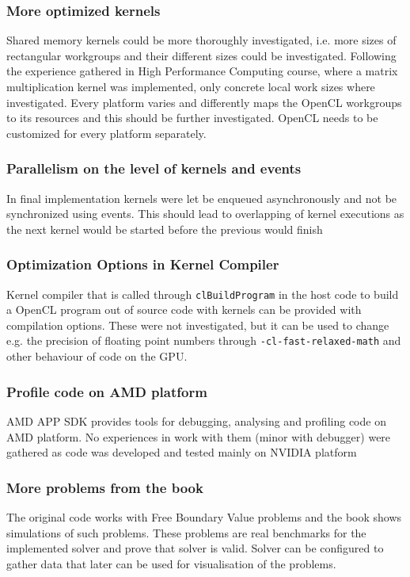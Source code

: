\subsubsection{More optimized kernels}
Shared memory kernels could be more thoroughly investigated, i.e. more sizes of rectangular workgroups and their different sizes could be investigated. Following the experience gathered in High Performance Computing course, where a matrix multiplication kernel was implemented, only concrete local work sizes where investigated. Every platform varies and differently maps the OpenCL workgroups to its resources and this should be further investigated. OpenCL needs to be customized for every platform separately. 

\subsubsection{Parallelism on the level of kernels and events}
In final implementation kernels were let be enqueued asynchronously and not be synchronized using events. This should lead to overlapping of kernel executions as the next kernel would be started before the previous would finish

\subsubsection{Optimization Options in Kernel Compiler}
Kernel compiler that is called through \texttt{clBuildProgram} in the host code to build a OpenCL program out of source code with kernels can be provided with compilation options. These were not investigated, but it can be used to change e.g. the precision of floating point numbers through \texttt{-cl-fast-relaxed-math} and other behaviour of code on the GPU.

\subsubsection{Profile code on AMD platform}
AMD APP SDK provides tools for debugging, analysing and profiling code on AMD platform. No  experiences in work with them (minor with debugger) were gathered as code was developed and tested mainly on NVIDIA platform 

\subsubsection{More problems from the book}
The original code works with Free Boundary Value problems and the book shows simulations of such problems. These problems are real benchmarks for the implemented solver and prove that solver is valid. Solver can be configured to gather data that later can be used for visualisation of the problems.

